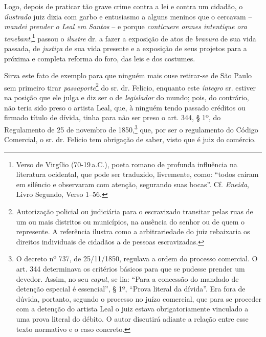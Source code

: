 Logo, depois de praticar tão grave crime contra a lei e contra um
cidadão, o \emph{ilustrado} juiz dizia com garbo e entusiasmo a alguns
meninos que o cercavam -- \emph{mandei prender o Leal em Santos} -- e
porque \emph{conticuere omnes intentique ora tenebant},\footnote{ Verso
  de Virgílio (70-19\,a.C.), poeta romano de profunda influência na
  literatura ocidental, que pode ser traduzido, livremente, como: ``todos
  caíram em silêncio e observaram com atenção, segurando suas bocas''.
  Cf. \emph{Eneida}, Livro Segundo, Verso 1--56.} passou o \emph{ilustre}
dr. a fazer a exposição de atos de \emph{bravura} de sua vida passada,
de \emph{justiça} de sua vida presente e a exposição de seus projetos
para a próxima e completa reforma do foro, das leis e dos costumes.

Sirva este fato de exemplo para que ninguém mais ouse retirar-se de São
Paulo sem primeiro tirar \emph{passaporte}\footnote{ Autorização
  policial ou judiciária para o escravizado transitar pelas ruas de um
  ou mais distritos ou municípios, na ausência do senhor ou de quem o
  represente. A referência ilustra como a arbitrariedade do juiz
  rebaixaria os direitos individuais de cidadãos a de pessoas
  escravizadas.} do sr. dr. Felicio, enquanto este \emph{íntegro} sr.
estiver na posição que ele julga e diz ser o de \emph{legislador} do
mundo; pois, do contrário, não teria sido preso o artista Leal, que, à
ninguém tendo passado créditos ou firmado título de dívida, tinha para
não ser preso o art. 344, § 1º, do Regulamento de 25 de novembro de
1850,\footnote{ O decreto nº 737, de 25/11/1850, regulava a ordem do
  processo comercial. O art. 344 determinava os critérios básicos para
  que se pudesse prender um devedor. Assim, no seu \emph{caput}, se lia:
  ``Para a concessão do mandado de detenção especial é essencial'', § 1º,
  ``Prova literal da dívida''. Era fora de dúvida, portanto, segundo o
  processo no juízo comercial, que para se proceder com a detenção do
  artista Leal o juiz estava obrigatoriamente vinculado a uma prova
  literal do débito. O autor discutirá adiante a relação entre esse
  texto normativo e o caso concreto.} que, por ser o regulamento do
Código Comercial, o sr. dr. Felicio tem obrigação de saber, visto que é
juiz do comércio.


